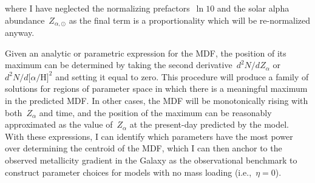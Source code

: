 \documentclass[12pt]{article}
\newcommand{\ah}{\ensuremath{\text{[$\alpha$/H]}}}
\begin{document}
where I have neglected the normalizing prefactors~$\ln 10$ and the solar
alpha abundance~$Z_{\alpha,\odot}$ as the final term is a proportionality which
will be re-normalized anyway.
\par
Given an analytic or parametric expression for the MDF, the position of its
maximum can be determined by taking the second derivative~$d^2 N / d Z_\alpha$
or~$d^2 N / d \ah^2$ and setting it equal to zero.
This procedure will produce a family of solutions for regions of parameter
space in which there is a meaningful maximum in the predicted MDF.
In other cases, the MDF will be monotonically rising with both~$Z_\alpha$ and
time, and the position of the maximum can be reasonably approximated as the
value of~$Z_\alpha$ at the present-day predicted by the model.
With these expressions, I can identify which parameters have the most power
over determining the centroid of the MDF, which I can then anchor to the
observed metallicity gradient in the Galaxy as the observational benchmark to
construct parameter choices for models with no mass loading (i.e.,~$\eta = 0$).
\end{document}

